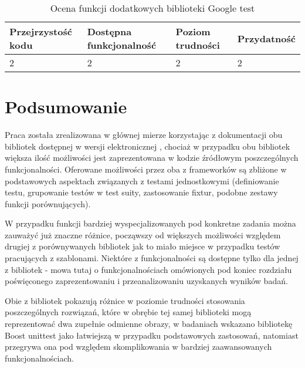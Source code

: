 \documentclass[12pt,a4paper,notitlepage]{report}
\begin{document}
			


\begin{center}
			\begin{table}[!ht]
			\caption{Ocena funkcji dodatkowych biblioteki Google test}
			\label{}
			\begin{tabular}[!hc]{|l|l|l|l|}
		\hline
		Przejrzystość kodu 	&	Dostępna funkcjonalność	&	Poziom trudności	&	Przydatność \\ \hline
		2					&	2						&	2					& 	2  			\\ \hline
			\end{tabular}
			\end{table} 
		\end{center}

\chapter{Podsumowanie}
	Praca została zrealizowana w głównej mierze korzystając z dokumentacji obu bibliotek dostępnej w wersji elektronicznej \cite{Primer}\cite{Advanced}\cite{Boost}, chociaż w przypadku obu bibliotek większa ilość możliwości jest zaprezentowana w kodzie źródłowym poszczególnych funkcjonalności. Oferowane możliwości przez oba z frameworków są zbliżone w podstawowych aspektach związanych z testami jednostkowymi (definiowanie testu, grupowanie testów w test suity, zastosowanie fixtur, podobne zestawy funkcji porównujących).

	W przypadku funkcji bardziej wyspecjalizowanych pod konkretne zadania można zauważyć już znaczne różnice, począwszy od większych możliwości względem drugiej z porównywanych bibliotek jak to miało miejsce w przypadku testów pracujących z szablonami. Niektóre z funkcjonalności są dostępne tylko dla jednej z bibliotek - mowa tutaj o funkcjonalnościach omówionych pod koniec rozdziału poświęconego zaprezentowaniu i przeanalizowaniu uzyskanych wyników badań.

	Obie z bibliotek pokazują różnice w poziomie trudności stosowania poszczególnych rozwiązań, które w obrębie tej samej biblioteki mogą reprezentować dwa zupełnie odmienne obrazy, w badaniach wskazano bibliotekę Boost unittest jako łatwiejszą w przypadku podstawowych zastosowań, natomiast przegrywa ona pod względem skomplikowania w bardziej zaawansowanych funkcjonalnościach.
\end{document}

